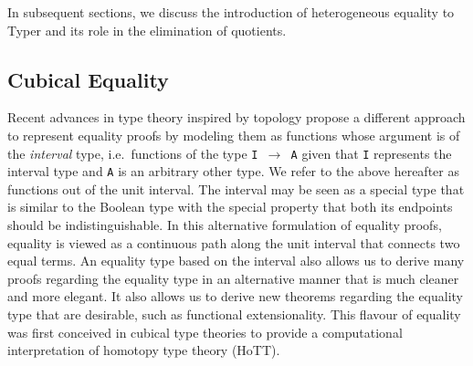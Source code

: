 \documentclass[12pt,twoside,maitrise]{dms}
\theoremstyle{definition}
\numberwithin{equation}{section}
\numberwithin{table}{chapter}
\numberwithin{figure}{chapter}
\newcommand\id[1] {\texttt{#1}}
\newcommand\fn[1] {\texttt{#1}}
\begin{document}
In subsequent sections, we discuss the introduction of heterogeneous equality to
Typer and its role in the elimination of quotients.


\subsection*{Cubical Equality}

Recent advances in type theory inspired by topology propose a different approach
to represent equality proofs by modeling them as functions whose argument is of
the \emph{interval} type, i.e.\ functions of the type \fn{I $\rightarrow$ A}
given that \id{I} represents the interval type and \id{A} is an arbitrary other
type. We refer to the above hereafter as functions out of the unit interval. The
interval may be seen as a special type that is similar to the Boolean type with
the special property that both its endpoints should be indistinguishable. In
this alternative formulation of equality proofs, equality is viewed as a
continuous path along the unit interval that connects two equal terms.
An equality type based on the interval also allows us to derive many proofs
regarding the equality type in an alternative manner that is much cleaner and
more elegant. It also allows us to derive new theorems regarding the equality
type that are desirable, such as functional extensionality. This flavour of
equality was first conceived in cubical type theories\cite{bezem2014model} to
provide a computational interpretation of homotopy type theory
(HoTT)\cite{HoTTbook}.
\end{document}
